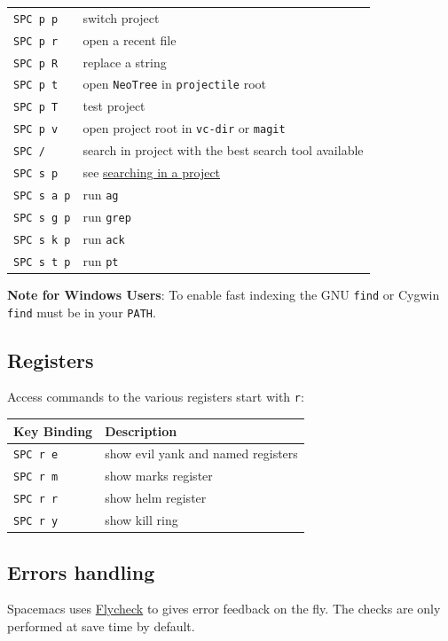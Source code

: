 \documentclass[11pt]{article}
\begin{document}
\begin{center}
\begin{tabular}{ll}
\texttt{SPC p p} & switch project\\
\texttt{SPC p r} & open a recent file\\
\texttt{SPC p R} & replace a string\\
\texttt{SPC p t} & open \texttt{NeoTree} in \texttt{projectile} root\\
\texttt{SPC p T} & test project\\
\texttt{SPC p v} & open project root in \texttt{vc-dir} or \texttt{magit}\\
\texttt{SPC /} & search in project with the best search tool available\\
\texttt{SPC s p} & see \hyperref[sec:org7eedc5e]{searching in a project}\\
\texttt{SPC s a p} & run \texttt{ag}\\
\texttt{SPC s g p} & run \texttt{grep}\\
\texttt{SPC s k p} & run \texttt{ack}\\
\texttt{SPC s t p} & run \texttt{pt}\\
\end{tabular}
\end{center}

\textbf{Note for Windows Users}: To enable fast indexing the GNU \texttt{find} or
Cygwin \texttt{find} must be in your \texttt{PATH}.

\subsection{Registers}
\label{sec:orgfd6bd60}
Access commands to the various registers start with \texttt{r}:

\begin{center}
\begin{tabular}{ll}
Key Binding & Description\\
\hline
\texttt{SPC r e} & show evil yank and named registers\\
\texttt{SPC r m} & show marks register\\
\texttt{SPC r r} & show helm register\\
\texttt{SPC r y} & show kill ring\\
\end{tabular}
\end{center}

\subsection{Errors handling}
\label{sec:org91d20ad}
Spacemacs uses \href{https://github.com/flycheck/flycheck}{Flycheck} to gives error feedback on the fly. The checks are
only performed at save time by default.
\end{document}
